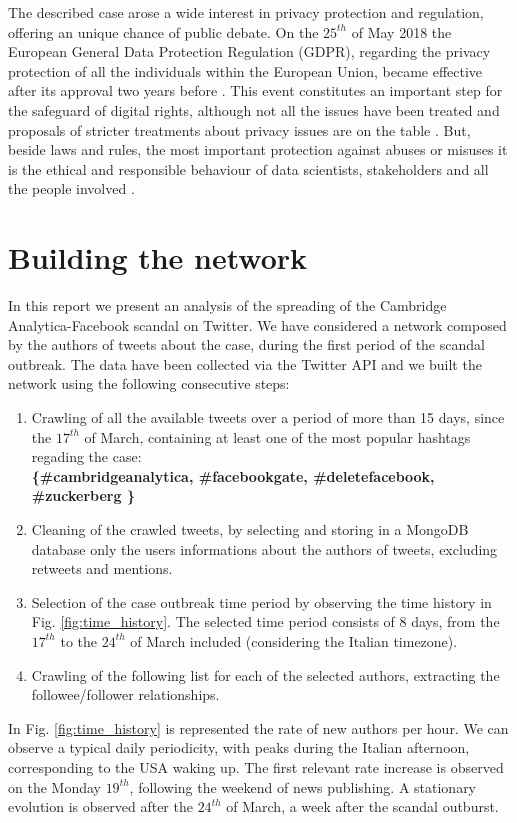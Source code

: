 \documentclass[11pt, twoside]{report}
\begin{document}
The described case arose a wide interest in privacy protection and regulation, offering an unique chance of public debate.
On the $25^{th}$ of May 2018 the European General Data Protection Regulation (GDPR), regarding the privacy protection of
all the individuals within the European Union, became effective after its approval two years before \cite{gdpr}.
This event constitutes an important step for the safeguard of digital rights, although not all the issues have been treated and proposals
of stricter treatments about privacy issues are on the table \cite{stallman}.
But, beside laws and rules, the most important protection against abuses or misuses it is the ethical and responsible behaviour of data scientists, stakeholders and all the people involved \cite{fair}.


    \chapter{Building the network}
    In this report we present an analysis of the spreading of the Cambridge Analytica-Facebook scandal on Twitter.
    We have considered a network composed by the authors of tweets about the case, during the first period of the scandal outbreak. The data have been collected via the Twitter API and we built the network using the following consecutive steps:
    \begin{enumerate}
    \item Crawling of all the available tweets over a period of more than 15 days, since the $17^{th}$ of March, containing at least one of the most popular hashtags regading the case:\\
    \textbf{  \{\#cambridgeanalytica, \#facebookgate, \#deletefacebook, \#zuckerberg \} }
      
    \item Cleaning of the crawled tweets, by selecting and storing in a MongoDB database only the users informations about the authors of tweets, excluding retweets and mentions.
    \item Selection of the case outbreak time period by observing the time history in Fig. \ref{fig:time_history}. The selected time period consists of 8 days, from the $17^{th}$ to the $24^{th}$ of March included (considering the Italian timezone). 
      
    \item Crawling of the following list for each of the selected authors, extracting the followee/follower relationships.
    \end{enumerate}
    In Fig. \ref{fig:time_history} is represented the rate of new authors per hour. %
    We can observe a typical daily periodicity, with peaks during the Italian afternoon, corresponding to the USA waking up.
    The first relevant rate increase is observed on the Monday $19^{th}$, following the weekend of news publishing. A stationary evolution is observed after the $24^{th}$ of March, a week after the scandal outburst.
\end{document}
